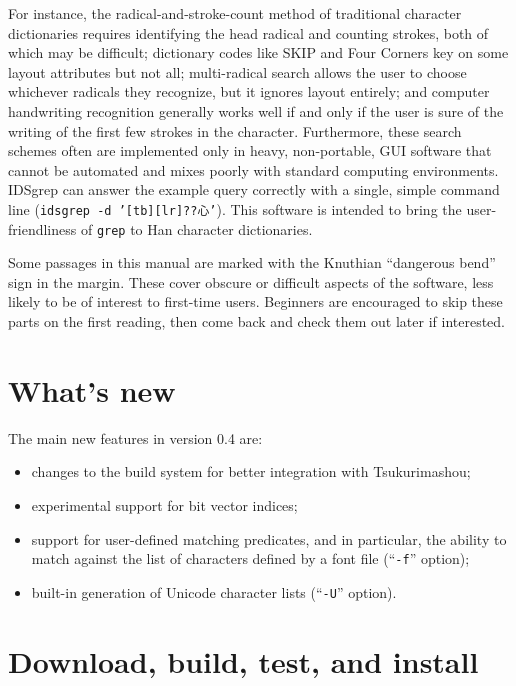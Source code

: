 \documentclass[twocolumn]{report}
\newcommand{\DangerousBend}{\marginpar{\large\hfill\dbend\hfill\null}}
\begin{document}
For instance, the radical-and-stroke-count method of traditional character
dictionaries requires identifying the head radical and counting strokes,
both of which may be difficult; dictionary codes like SKIP and Four Corners
key on some layout attributes but not all; multi-radical search allows the
user to choose whichever radicals they recognize, but it ignores layout
entirely; and computer handwriting recognition generally works well if and
only if the user is sure of the writing of the first few strokes in the
character.  Furthermore, these search schemes often are implemented only in
heavy, non-portable, GUI software that cannot be automated and mixes poorly
with standard computing environments.  IDSgrep can answer the example query
correctly with a single, simple command line (\texttt{idsgrep -d
'[tb][lr]??心'}).  This software is intended to bring the user-friendliness
of \texttt{grep} to Han character dictionaries.

Some \DangerousBend passages in this manual are marked with the Knuthian
``dangerous bend'' sign in the margin.  These cover obscure or difficult
aspects of the software, less likely to be of interest to first-time users. 
Beginners are encouraged to skip these parts on the first reading, then come
back and check them out later if interested.


\section{What's new}

The main new features in version 0.4 are:
\begin{itemize}
  \item changes to the build system for better integration with
    Tsukurimashou;
  \item experimental support for bit vector indices;
  \item support for user-defined matching predicates, and in particular, the
    ability to match against the list of characters defined by a font file
    (``\texttt{-f}'' option);
  \item built-in generation of Unicode character lists (``\mbox{\texttt{-U}}''
    option).
\end{itemize}


\section{Download, build, test, and install}
\end{document}
